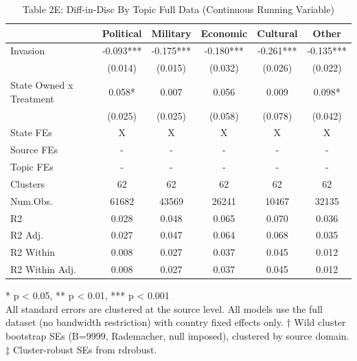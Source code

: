 \begin{table}[t]
\caption{\label{tab:table2e}Table 2E: Diff-in-Disc By Topic Full Data (Continuous Running Variable)} 
\fontsize{12.0pt}{14.0pt}\selectfont
\begin{tabular*}{\linewidth}{@{\extracolsep{\fill}}lccccc}
\toprule
  & Political & Military & Economic & Cultural & Other \\ 
\midrule\addlinespace[2.5pt]
Invasion & -0.093*** & -0.175*** & -0.180*** & -0.261*** & -0.135*** \\ 
 & (0.014) & (0.015) & (0.032) & (0.026) & (0.022) \\ 
State Owned x Treatment & 0.058* & 0.007 & 0.056 & 0.009 & 0.098* \\ 
{} & {(0.025)} & {(0.025)} & {(0.058)} & {(0.078)} & {(0.042)} \\ 
State FEs & X & X & X & X & X \\ 
Source FEs & - & - & - & - & - \\ 
Topic FEs & - & - & - & - & - \\ 
Clusters & 62 & 62 & 62 & 62 & 62 \\ 
Num.Obs. & 61682 & 43569 & 26241 & 10467 & 32135 \\ 
R2 & 0.028 & 0.048 & 0.065 & 0.070 & 0.036 \\ 
R2 Adj. & 0.027 & 0.047 & 0.064 & 0.068 & 0.035 \\ 
R2 Within & 0.008 & 0.027 & 0.037 & 0.045 & 0.012 \\ 
R2 Within Adj. & 0.008 & 0.027 & 0.037 & 0.045 & 0.012 \\ 
\bottomrule
\end{tabular*}
\begin{minipage}{\linewidth}
\vspace{.05em}
* p < 0.05, ** p < 0.01, *** p < 0.001\\
All standard errors are clustered at the source level. All models use the full
dataset (no bandwidth restriction) with country fixed effects only. † Wild
cluster bootstrap SEs (B=9999, Rademacher, null imposed), clustered by source
domain. ‡ Cluster-robust SEs from rdrobust.\\
\end{minipage}
\end{table}

